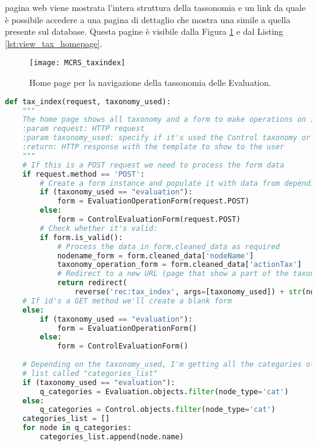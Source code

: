 pagina web viene mostrata l'intera struttura della tassonomia e un link da quale è possibile accedere a una pagina di dettaglio che mostra una 
simile a quella presente sul database. Questa pagine è visibile dalla Figura \ref{fig:MCRS_taxindex} e dal Listing \ref{lst:view_tax_homepage}.
%
\newpage
%
\begin{figure}[ht!]
    \texttt{[image: MCRS\_taxindex]}
    \caption{Home page per la navigazione della tassonomia delle Evaluation.}
    \label{fig:MCRS_taxindex}
\end{figure}
\lstset{style=python_code_style}
\begin{lstlisting}[language=Python, label=lst:view_tax_homepage, caption={Home page dalla quale è possibile richiamare 
    diverse operazioni eseguibili sulla tassonomia.}]
def tax_index(request, taxonomy_used):
    """
    The home page shows all taxonomy and a form to make operations on it.
    :param request: HTTP request
    :param taxonomy_used: specify if it's used the Control taxonomy or the Evaluation taxonomy
    :return: HTTP response with the template to show to the user
    """
    # If this is a POST request we need to process the form data
    if request.method == 'POST':
        # Create a form instance and populate it with data from depending on the taxonomy_used
        if (taxonomy_used == "evaluation"):
            form = EvaluationOperationForm(request.POST)
        else:
            form = ControlEvaluationForm(request.POST)
        # Check whether it's valid:
        if form.is_valid():
            # Process the data in form.cleaned_data as required
            nodename_form = form.cleaned_data['nodeName']
            taxonomy_operation_form = form.cleaned_data['actionTax']
            # Redirect to a new URL (page that show a part of the taxonomy, depending on the action user has chosen):
            return redirect(
                reverse('rec:tax_index', args=[taxonomy_used]) + str(nodename_form) + '_' + taxonomy_operation_form)
    # If id's a GET method we'll create a blank form
    else:
        if (taxonomy_used == "evaluation"):
            form = EvaluationOperationForm()
        else:
            form = ControlEvaluationForm()
 
    # Depending on the taxonomy_used, I'm getting all the categories of Evaluations or Controls taxonomy and save it in a
    # list called "categories_list"
    if (taxonomy_used == "evaluation"):
        q_categories = Evaluation.objects.filter(node_type='cat')
    else:
        q_categories = Control.objects.filter(node_type='cat')
    categories_list = []
    for node in q_categories:
        categories_list.append(node.name)
 

\end{lstlisting}
